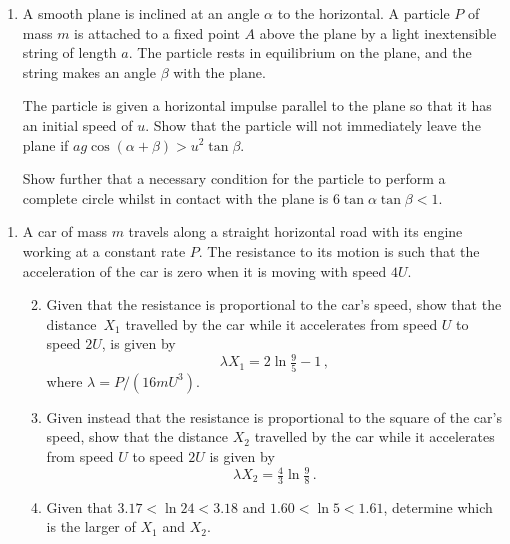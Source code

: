 \documentclass[a4, 11pt]{report}
\newlength{\qspace}
\newcounter{qnumber}
\newenvironment{question}%
 {\vspace{\qspace}
  \begin{enumerate}[\bfseries 1\quad][10]%
    \setcounter{enumi}{\value{qnumber}}%
    \item%
 }
{
  \end{enumerate}
  \filbreak
  \stepcounter{qnumber}
 }
\newenvironment{questionparts}[1][1]%
 {
  \begin{enumerate}[\bfseries (i)]%
    \setcounter{enumii}{#1}
    \addtocounter{enumii}{-1}
    \setlength{\itemsep}{5mm}
    \setlength{\parskip}{8pt}
 }
 {
  \end{enumerate}
 }
\begin{document}
\begin{question}
A smooth plane is inclined
at an angle $\alpha$ to the horizontal. A particle $P$ of mass $m$
 is attached to a fixed point $A$
 above the plane by a light inextensible string of length $a$.
The particle rests in equilibrium on the plane,
and the string makes an angle $\beta$ with the plane.

The particle is given a horizontal impulse parallel 
to the plane so that it has an initial speed
of $u$. 
Show that the particle will not immediately leave the plane 
if $ag\cos(\alpha + \beta)> u^2 \tan\beta$.

Show further that a necessary condition  for the 
particle to perform a complete circle whilst in
contact with the plane is
$6\tan\alpha  \tan \beta < 1$.

\end{question}
\begin{question}
A car of mass $m$ travels along a straight horizontal road with 
its engine working  at a
constant rate $P$. The  resistance to its motion 
is such that
the  acceleration of the car is zero 
 when it is moving with speed
$4U$. 

\begin{questionparts}
\item
Given that the  resistance is proportional to the car's speed, 
show that 
the distance~$X_1$ travelled by the car 
while 
it accelerates from speed $U$ to speed $2U$, 
is given by
\[
\lambda X_1 = 2\ln \tfrac 9 5 - 1
\,,
\]
where $\lambda= P/(16mU^3)$.

\item
Given instead that  the  resistance is proportional to the square 
of the car's speed, show that 
the distance $X_2$ travelled  by the car while it accelerates from 
speed  $U$ to speed $2U$
is given by
\[
\lambda X_2 = \tfrac43 \ln \tfrac 98
\,.
\] 
\item
Given that  $3.17<\ln 24 < 3.18$ and $1.60<\ln 5 < 1.61$,
determine which is the larger of 
$X_1$ and $X_2$.
\end{questionparts} 

\end{question}


\newpage
\end{document}
